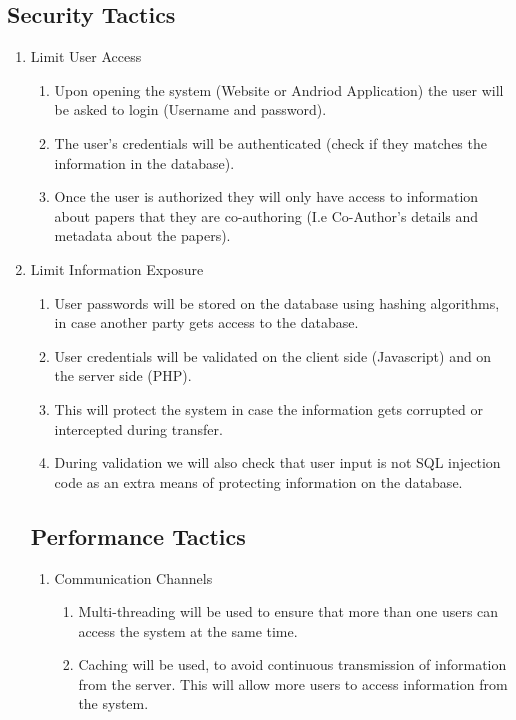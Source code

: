 \documentclass[hidelinks,a4paper,12pt]{article}
\begin{document}
\subsection{Security Tactics}
\begin{enumerate}
	\item  Limit User Access
	\begin{enumerate}
		\item  Upon opening the system (Website or Andriod Application) the user will be asked to login (Username and password).
		\item The user's credentials will be authenticated (check if they matches the information in the database).
		\item Once the user is authorized they will only have access to information about papers that they are co-authoring (I.e Co-Author's details and metadata about the papers).
	\end{enumerate}
	
	\item  Limit Information Exposure
	\begin{enumerate}
		\item  User passwords will be stored on the database using hashing algorithms, in case another party gets access to the database.
		\item User credentials will be validated on the client side (Javascript) and on the server side (PHP).
		\item  This will protect the system in case the information gets corrupted or intercepted during transfer.
		\item During validation we will also check that user input is not SQL injection code as an extra means of protecting information on the database.
	\end{enumerate}
	
	\subsection{Performance Tactics}
	\begin{enumerate}
		\item  Communication Channels
		\begin{enumerate}
			\item  Multi-threading will be used to ensure that more than one users can access the system at the same time.
			\item Caching will be used, to avoid continuous transmission of information from the server. This will allow more users to access information from the system.
		\end{enumerate}
		

\end{enumerate}
\end{enumerate}
\end{document}
